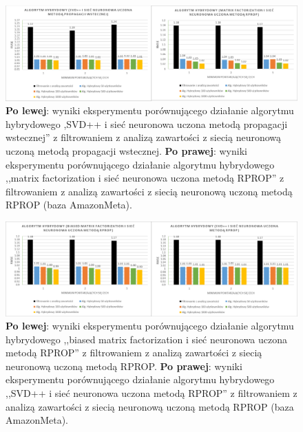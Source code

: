 \documentclass[twoside]{iisthesis}
\begin{document}
		\begin{figure}
			\centering
			\includegraphics[width=1\textwidth]{am_exphybrid1_2}			
			\caption{\textbf{Po lewej}: wyniki eksperymentu porównującego działanie algorytmu hybrydowego ,SVD++ i sieć neuronowa uczona metodą propagacji wstecznej'' z filtrowaniem z analizą zawartości z siecią neuronową uczoną metodą propagacji wstecznej. \textbf{Po prawej}: wyniki eksperymentu porównującego działanie algorytmu hybrydowego ,,matrix factorization i sieć neuronowa uczona metodą RPROP'' z filtrowaniem z analizą zawartości z siecią neuronową uczoną metodą RPROP (baza AmazonMeta).}
			\label{fig:am_exphybrid1_2}
		\end{figure}
	
		\begin{figure}
			\centering
			\includegraphics[width=1\textwidth]{am_exphybrid1_3}			
			\caption{\textbf{Po lewej}: wyniki eksperymentu porównującego działanie algorytmu hybrydowego ,,biased matrix factorization i sieć neuronowa uczona metodą RPROP'' z filtrowaniem z analizą zawartości z siecią neuronową uczoną metodą RPROP. \textbf{Po prawej}: wyniki eksperymentu porównującego działanie algorytmu hybrydowego ,,SVD++ i sieć neuronowa uczona metodą RPROP'' z filtrowaniem z analizą zawartości z siecią neuronową uczoną metodą RPROP (baza AmazonMeta).}
			\label{fig:am_exphybrid1_3}
		\end{figure}
	
\end{document}
